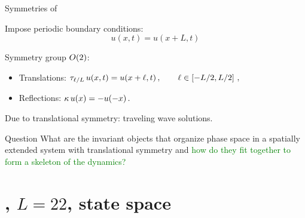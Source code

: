 \documentclass{beamer}
\begin{document}
\begin{frame}{Symmetries of \KSe}

Impose periodic boundary conditions:
\[
 u(x,t) = u(x+L,t)
\]

Symmetry group $O(2)$:
\begin{itemize}
 \item Translations: $\tau_{\ell/L}\, u(x,t) = u(x+\ell,t)\,,\qquad \ell\in\left[-L/2,L/2\right]\,,$
 \item Reflections:  $\kappa \, u(x) = -u(-x)\,.$
\end{itemize}

Due to translational symmetry: traveling wave solutions.

\begin{block}{Question} 
What are the invariant objects that organize phase space in a spatially extended system 
with translational symmetry and \textcolor{green}{how do they fit together to form a
skeleton of the dynamics?}
\end{block}


\end{frame}




\section[KSe, $L=22$]{\KS, $L=22$, state space }
\end{document}
